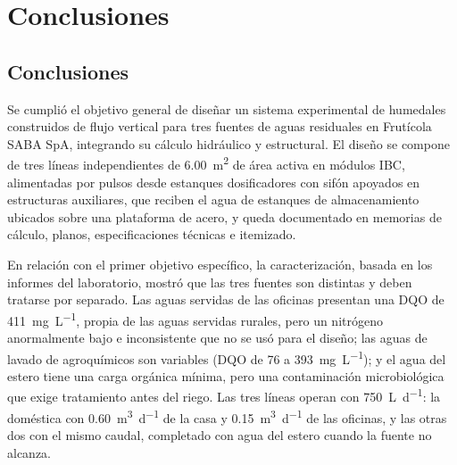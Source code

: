 \chapter{Conclusiones}
\label{cap:conclusiones}

\section{Conclusiones}
\label{sec:conclusiones}

Se cumplió el objetivo general de diseñar un sistema experimental de humedales construidos de flujo vertical para tres fuentes de aguas residuales en Frutícola SABA SpA, integrando su cálculo hidráulico y estructural.
El diseño se compone de tres líneas independientes de \qty{6.00}{\square\meter} de área activa en módulos IBC, alimentadas por pulsos desde estanques dosificadores con sifón apoyados en estructuras auxiliares, que reciben el agua de estanques de almacenamiento ubicados sobre una plataforma de acero, y queda documentado en memorias de cálculo, planos, especificaciones técnicas e itemizado.

En relación con el primer objetivo específico, la caracterización, basada en los informes del laboratorio, mostró que las tres fuentes son distintas y deben tratarse por separado.
Las aguas servidas de las oficinas presentan una DQO de \qty{411}{\milli\gram\per\liter}, propia de las aguas servidas rurales, pero un nitrógeno anormalmente bajo e inconsistente que no se usó para el diseño; las aguas de lavado de agroquímicos son variables (DQO de 76 a \qty{393}{\milli\gram\per\liter}); y el agua del estero tiene una carga orgánica mínima, pero una contaminación microbiológica que exige tratamiento antes del riego.
Las tres líneas operan con \qty{750}{\liter\per\day}: la doméstica con \qty{0.60}{\cubic\meter\per\day} de la casa y \qty{0.15}{\cubic\meter\per\day} de las oficinas, y las otras dos con el mismo caudal, completado con agua del estero cuando la fuente no alcanza.

